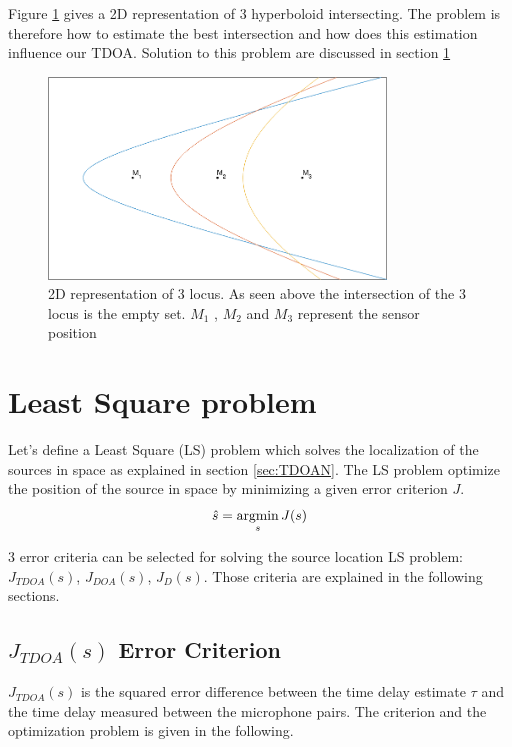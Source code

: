 Figure \ref{fig:hyperboloid_intersect} gives a 2D representation of 3 hyperboloid intersecting. The problem is therefore how to estimate the best intersection and how does this estimation influence our TDOA. Solution to this problem are discussed in section \ref{sec:LSTDOA}

\begin{figure}[H]
    \centering
    \includegraphics[width=0.8\textwidth]{Figures/intersect.png}
    \caption{2D representation of 3 locus. As seen above the intersection of the 3 locus is the empty set. $M_{1}$ , $M_{2}$ and $M_{3}$ represent the sensor position}
    \label{fig:hyperboloid_intersect}
\end{figure}

\section{Least Square problem}\label{sec:LSTDOA}

Let's define a Least Square (LS) problem which solves the localization of the sources in space as explained in section \ref{sec:TDOAN}. The LS problem optimize the position of the source in space by minimizing a given error criterion $ J $.
\begin{equation}
\hat{s}= \argmin_{s} J(s) 
\end{equation}

3 error criteria can be selected for solving the source location LS problem:  $J_{TDOA}(s)$, $J_{DOA}(s)$, $J_{D}(s)$. Those criteria are explained in the following sections.

\subsection{$J_{TDOA}(s)$ Error Criterion}

$J_{TDOA}(s)$ is the squared error difference between the time delay estimate $\tau$ and the time delay measured between the microphone pairs. The criterion and the optimization problem is given in the following.

